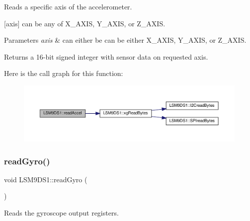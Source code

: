 Reads a specific axis of the accelerometer. 

\mbox{[}axis\mbox{]} can be any of X\+\_\+\+A\+X\+IS, Y\+\_\+\+A\+X\+IS, or Z\+\_\+\+A\+X\+IS.


\begin{DoxyParams}{Parameters}
{\em axis} & can either be can be either X\+\_\+\+A\+X\+IS, Y\+\_\+\+A\+X\+IS, or Z\+\_\+\+A\+X\+IS. \\
\hline
\end{DoxyParams}
\begin{DoxyReturn}{Returns}
a 16-\/bit signed integer with sensor data on requested axis. 
\end{DoxyReturn}
Here is the call graph for this function\+:
\nopagebreak
\begin{figure}[H]
\begin{center}
\leavevmode
\includegraphics[width=350pt]{classLSM9DS1_acbe3bfc0b8db7fe3f77893d22c394594_cgraph}
\end{center}
\end{figure}
\mbox{\label{classLSM9DS1_a56e9710cb538a4c7f7ab94c2ca256ce9}} 
\subsubsection{\texorpdfstring{read\+Gyro()}{readGyro()}\hspace{0.1cm}{\footnotesize\ttfamily [1/2]}}
{\footnotesize\ttfamily void L\+S\+M9\+D\+S1\+::read\+Gyro (\begin{DoxyParamCaption}{ }\end{DoxyParamCaption})}



Reads the gyroscope output registers. 

